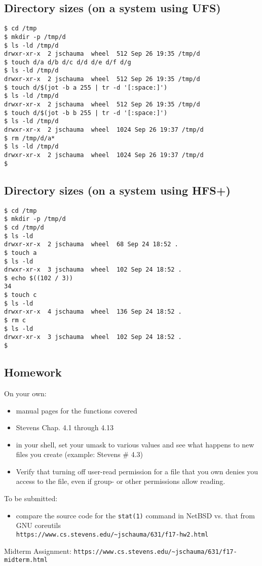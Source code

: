 \documentclass[xga]{xdvislides}
\begin{document}
\subsection{Directory sizes (on a system using UFS)}
\begin{verbatim}
$ cd /tmp
$ mkdir -p /tmp/d
$ ls -ld /tmp/d
drwxr-xr-x  2 jschauma  wheel  512 Sep 26 19:35 /tmp/d
$ touch d/a d/b d/c d/d d/e d/f d/g
$ ls -ld /tmp/d
drwxr-xr-x  2 jschauma  wheel  512 Sep 26 19:35 /tmp/d
$ touch d/$(jot -b a 255 | tr -d '[:space:]')
$ ls -ld /tmp/d
drwxr-xr-x  2 jschauma  wheel  512 Sep 26 19:35 /tmp/d
$ touch d/$(jot -b b 255 | tr -d '[:space:]')
$ ls -ld /tmp/d
drwxr-xr-x  2 jschauma  wheel  1024 Sep 26 19:37 /tmp/d
$ rm /tmp/d/a*
$ ls -ld /tmp/d
drwxr-xr-x  2 jschauma  wheel  1024 Sep 26 19:37 /tmp/d
$
\end{verbatim}

\subsection{Directory sizes (on a system using HFS+)}
\begin{verbatim}
$ cd /tmp
$ mkdir -p /tmp/d
$ cd /tmp/d
$ ls -ld
drwxr-xr-x  2 jschauma  wheel  68 Sep 24 18:52 .
$ touch a
$ ls -ld
drwxr-xr-x  3 jschauma  wheel  102 Sep 24 18:52 .
$ echo $((102 / 3))
34
$ touch c
$ ls -ld
drwxr-xr-x  4 jschauma  wheel  136 Sep 24 18:52 .
$ rm c
$ ls -ld
drwxr-xr-x  3 jschauma  wheel  102 Sep 24 18:52 .
$
\end{verbatim}

\subsection{Homework}
On your own:
\begin{itemize}
	\item manual pages for the functions covered
	\item Stevens Chap. 4.1 through 4.13
	\item in your shell, set your umask to various values and see what
          happens to new files you create (example: Stevens \# 4.3)
	\item Verify that turning off user-read permission for a file that you own
		denies you access to the file, even if group- or other permissions
		allow reading.
\end{itemize}
To be submitted:
\begin{itemize}
	\item compare the source code for the {\tt stat(1)} command in NetBSD vs. that from GNU coreutils \\
\verb+https://www.cs.stevens.edu/~jschauma/631/f17-hw2.html+
\end{itemize}
\addvspace{.5in}
Midterm Assignment:
\verb+https://www.cs.stevens.edu/~jschauma/631/f17-midterm.html+
\end{document}
